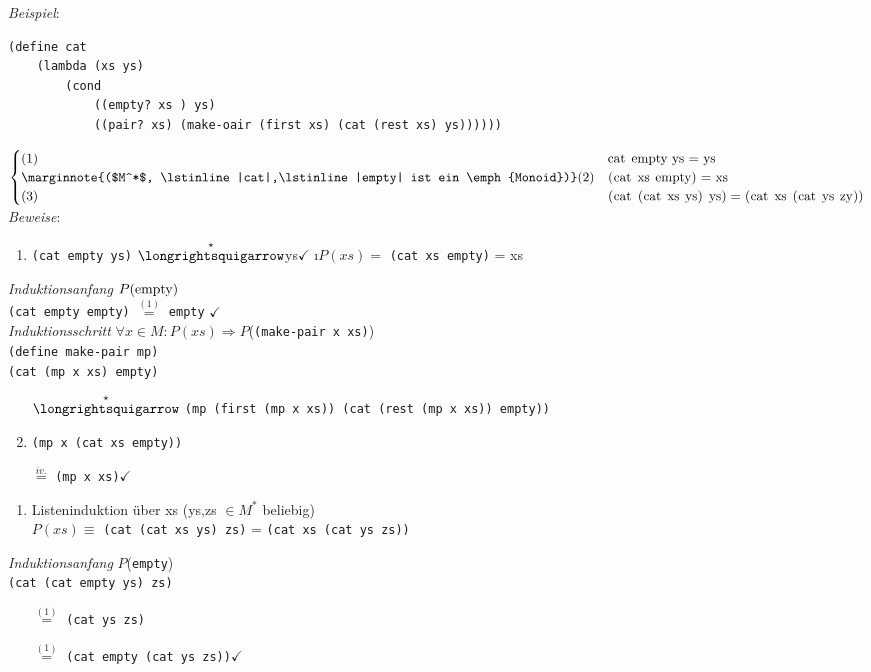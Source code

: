 \emph{Beispiel}:\\
\begin{lstlisting}
(define cat
	(lambda (xs ys)
		(cond
			((empty? xs ) ys)
			((pair? xs) (make-oair (first xs) (cat (rest xs) ys))))))
\end{lstlisting}

$\begin{cases}
	(1) & \text{\lstinline|cat empty ys| = ys}\\
	\marginnote{($M^*$, \lstinline|cat|,\lstinline|empty| ist ein \emph{Monoid})}(2) & \text{\lstinline|(cat xs empty)| = xs}\\
	(3) & \text{\lstinline|(cat (cat xs ys) ys)|} = \text{\lstinline|(cat xs (cat ys zy))|}
\end{cases}$
\emph{Beweise}:\\
\begin{enumerate}[(1)]
	\item \lstinline|(cat empty ys)| $\overset{\star}{\text{\eval}} $ys$ \checkmark$
	\i $P(xs) =$ \lstinline|(cat xs empty)| = xs 
\end{enumerate}
\emph{Induktionsanfang} $P(\text{\lstinline|empty|})$\\
\lstinline|(cat empty empty)| $\overset{(1)}{=}$ \lstinline|empty| $\checkmark$\\
\emph{Induktionsschritt} $\forall x \in M: P(xs) \Rightarrow P$(\lstinline|(make-pair x xs)|)\\
\lstinline|(define make-pair mp)|\\
\lstinline|(cat (mp x xs) empty)|
\begin{enumerate}[\eval]
\item[$\overset{\star}{\text{\eval}}$] \lstinline|(mp (first (mp x xs)) (cat (rest (mp x xs)) empty))|
\item \lstinline|(mp x (cat xs empty))|
\item[$\overset{iv.}{=}$] \lstinline|(mp x xs)|$\checkmark$
\end{enumerate}
\begin{enumerate}[(3)]
	\item Listeninduktion über xs (ys,zs $\in M^*$ beliebig)\\
	$P(xs) \equiv$ \lstinline|(cat (cat xs ys) zs)| = \lstinline|(cat xs (cat ys zs))| 
\end{enumerate}
\emph{Induktionsanfang} $P$(\lstinline|empty|)\\
\lstinline|(cat (cat empty ys) zs)|
\begin{enumerate}
\item[\eval]$\overset{(1)}{=}$ \lstinline|(cat ys zs)|
\item[\reval]$\overset{(1)}{=}$ \lstinline|(cat empty (cat ys zs))|$\checkmark$
\end{enumerate}
